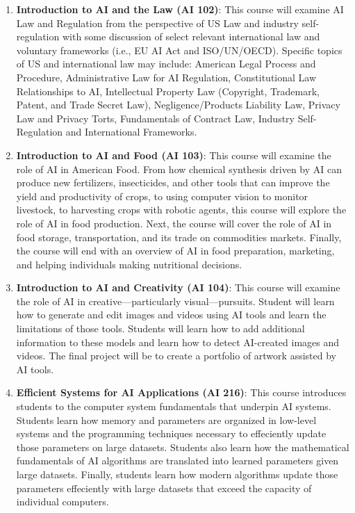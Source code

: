 \begin{enumerate}
\item \textbf{Introduction to AI and the Law (AI 102)}: This course will examine AI Law and Regulation from the perspective of US Law and industry self-regulation with some discussion of select relevant international law and voluntary frameworks (i.e., EU AI Act and ISO/UN/OECD). Specific topics of US and international law may include: American Legal Process and Procedure, Administrative Law for AI Regulation, Constitutional Law Relationships to AI, Intellectual Property Law (Copyright, Trademark, Patent, and Trade Secret Law), Negligence/Products Liability Law, Privacy Law and Privacy Torts, Fundamentals of Contract Law, Industry Self-Regulation and International Frameworks.
\item \textbf{Introduction to AI and Food (AI 103)}: This course will examine the role of AI in American Food.  From how chemical synthesis driven by AI can produce new fertilizers, insecticides, and other tools that can improve the yield and productivity of crops, to using computer vision to monitor livestock, to harvesting crops with robotic agents, this course will explore the role of AI in food production.  Next, the course will cover the role of AI in food storage, transportation, and its trade on commodities markets.  Finally, the course will end with an overview of AI in food preparation, marketing, and helping individuals making nutritional decisions.
\item \textbf{Introduction to AI and Creativity (AI 104)}: This course will examine the role of AI in creative---particularly visual---pursuits.  Student will learn how to generate and edit images and videos using AI tools and learn the limitations of those tools.  Students will learn how to add additional information to these models and learn how to detect AI-created images and videos.  The final project will be to create a portfolio of artwork assisted by AI tools.
\item \textbf{Efficient Systems for AI Applications (AI 216)}: This course introduces students to the computer system fundamentals that underpin AI systems.  Students learn how memory and parameters are organized in low-level systems and the programming techniques necessary to effeciently update those parameters on large datasets.  Students also learn how the mathematical fundamentals of AI algorithms are translated into learned parameters given large datasets.  Finally, students learn how modern algorithms update those parameters effeciently with large datasets that exceed the capacity of individual computers.

\end{enumerate}
